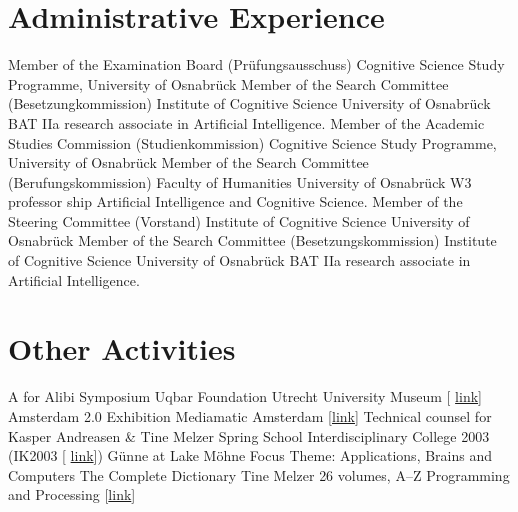 \documentclass[11pt,a4paper]{moderncv}
\begin{document}
\section{Administrative Experience}
        {Member of the Examination Board (Pr\"{u}fungsausschuss)}
        {}
        {Cognitive Science Study Programme, University of Osnabr\"{u}ck}
        {}
        {}
        {Member of the Search Committee (Besetzungkommission)}
        {}
        {Institute of Cognitive Science}
        {University of Osnabr\"{u}ck}
        {BAT IIa research associate in Artificial Intelligence.}
        {Member of the Academic Studies Commission (Studienkommission)}
        {}
        {Cognitive Science Study Programme, University of Osnabr\"{u}ck}
        {}
        {}
        {Member of the Search Committee (Berufungskommission)}
        {}
        {Faculty of Humanities}
        {University of Osnabr\"{u}ck}
        {W3 professor ship Artificial Intelligence and Cognitive Science.}
        {Member of the Steering Committee (Vorstand)}
        {}
        {Institute of Cognitive Science}
        {University of Osnabr\"{u}ck}
        {}
        {Member of the Search Committee (Besetzungskommission)}
        {}
        {Institute of Cognitive Science}
        {University of Osnabr\"{u}ck}
        {BAT IIa research associate in Artificial Intelligence.}
\closesection{}


\section{Other Activities}
        {A for Alibi Symposium}
        {}
        {Uqbar Foundation}
        {Utrecht University Museum [%
        \href{http://www.sternbergpress.com/?pageId=1204}{link}]}
        {}	
        {Amsterdam 2.0 Exhibition}
        {}
        {Mediamatic}
        {Amsterdam [\href{http://www.mediamatic.net/artefact-9850-en.html}%
        {link}]}
        {Technical counsel for Kasper Andreasen \& Tine Melzer}
        {Spring School}
        {}
        {Interdisciplinary College 2003 (IK2003 [%
        \href{http://www.ik-guenne.de/html/ik2003.html}{link}])}
        {G\"{u}nne at Lake M\"{o}hne}
        {Focus Theme: Applications, Brains and Computers}
        {The Complete Dictionary}
        {}
        {Tine Melzer}
        {26 volumes, A--Z}
        {Programming and Processing
        [\href{http://www.tinemelzer.eu/works/the-complete-dictionary/}
        {link}]}
\end{document}
